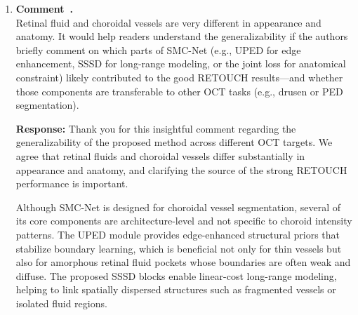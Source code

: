 \documentclass[11pt]{article}
\newcommand{\commentresponse}[2]{{\color{blue}\textbf{Response:} #2}}
\newcommand{\commentitem}{\item \textbf{Comment~\arabic{enumi}.}\\\ignorespaces}
\begin{document}
\begin{enumerate}
{    For transparency, we updated the corresponding sensitivity paragraph in the revised manuscript and quote it in italics:\\
    \textit{{\color{blue}``\textbf{C. Fractional-order Sensitivity}\\
    We analyze the sensitivity of the fractional-order parameter $v$ in UPED by sweeping $v\in\{0.2,0.4,0.6,0.8\}$ on the OCT-CCV validation folds.
    Across this range, vessel DSC varies by less than 0.3\%, with the best performance achieved at $v=0.6$, which is fixed for all experiments without dataset-specific tuning.
    Lower values ($v=0.2$--$0.4$) slightly under-emphasize weak vessel edges, while a higher value ($v=0.8$) introduces mild noise amplification; however, none of these settings destabilize training.\\
    UPED employs a fixed set of four canonical orientations ($0^\circ,45^\circ,90^\circ,135^\circ$) and aggregates them into an omni-directional response, eliminating the need for angle tuning.
    These results indicate that UPED exhibits low sensitivity to hyperparameter choices and remains robust and reproducible across varying OCT noise levels and imaging conditions.
    ''}}
    }
    
    \commentitem Retinal fluid and choroidal vessels are very different in appearance and anatomy. It would help readers understand the generalizability if the authors briefly comment on which parts of SMC-Net (e.g., UPED for edge enhancement, SSSD for long-range modeling, or the joint loss for anatomical constraint) likely contributed to the good RETOUCH results—and whether those components are transferable to other OCT tasks (e.g., drusen or PED segmentation).
    
    \commentresponse{4}{
    Thank you for this insightful comment regarding the generalizability of the proposed method across different OCT targets. We agree that retinal fluids and choroidal vessels differ substantially in appearance and anatomy, and clarifying the source of the strong RETOUCH performance is important.

    Although SMC-Net is designed for choroidal vessel segmentation, several of its core components are architecture-level and not specific to choroid intensity patterns. The UPED module provides edge-enhanced structural priors that stabilize boundary learning, which is beneficial not only for thin vessels but also for amorphous retinal fluid pockets whose boundaries are often weak and diffuse. The proposed SSSD blocks enable linear-cost long-range modeling, helping to link spatially dispersed structures such as fragmented vessels or isolated fluid regions.

}
\end{enumerate}
\end{document}
